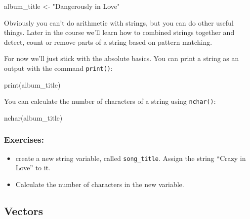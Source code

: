 \documentclass[
  letterpaper,
  DIV=11,
  numbers=noendperiod]{scrreprt}
\newenvironment{Shaded}{\begin{snugshade}}{\end{snugshade}}
\newcommand{\NormalTok}[1]{\textcolor[rgb]{0.00,0.23,0.31}{#1}}
\begin{document}
\begin{Shaded}
\begin{Highlighting}[]
\NormalTok{album\_title \textless{}{-} "Dangerously in Love"}
\end{Highlighting}
\end{Shaded}

Obviously you can't do arithmetic with strings, but you can do other
useful things. Later in the course we'll learn how to combined strings
together and detect, count or remove parts of a string based on pattern
matching.

For now we'll just stick with the absolute basics. You can print a
string as an output with the command \texttt{print()}:

\begin{Shaded}
\begin{Highlighting}[]
\NormalTok{print(album\_title)}
\end{Highlighting}
\end{Shaded}

You can calculate the number of characters of a string using
\texttt{nchar()}:

\begin{Shaded}
\begin{Highlighting}[]
\NormalTok{nchar(album\_title)}
\end{Highlighting}
\end{Shaded}

\subsubsection{Exercises:}\label{exercises-1}

\begin{itemize}
\item
  create a new string variable, called \texttt{song\_title}. Assign the
  string ``Crazy in Love'' to it.
\item
  Calculate the number of characters in the new variable.
\end{itemize}

\begin{Shaded}
\begin{Highlighting}[]

\end{Highlighting}
\end{Shaded}

\subsection{Vectors}\label{vectors}
\end{document}
